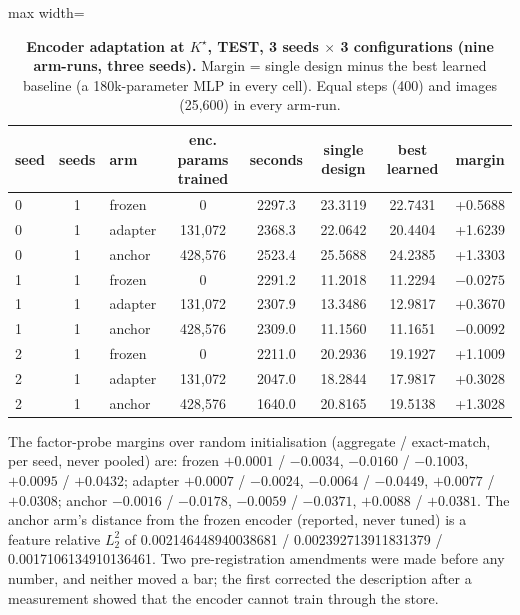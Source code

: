 \documentclass{article} %
\newcommand{\Kstar}{\ensuremath{K^{\star}}}
\begin{document}
\begin{table}[h]
\centering\small
\caption{\textbf{Encoder adaptation at $\Kstar$, TEST, 3 seeds $\times$ 3 configurations (nine
arm-runs, three seeds).} Margin = single design minus the best learned baseline (a 180k-parameter %
MLP in every cell). Equal steps (400) and images (25,600) in every arm-run.} %
\label{tab:adapt}
\setlength{\tabcolsep}{3pt}
\begin{adjustbox}{max width=\linewidth}\begin{tabular}{lclccccc}
\toprule
seed & seeds & arm & enc. params trained & seconds & single design & best learned & margin \\
\midrule
0 & 1 & frozen & 0 & 2297.3 & 23.3119 & 22.7431 & +0.5688 \\
0 & 1 & adapter & 131,072 & 2368.3 & 22.0642 & 20.4404 & +1.6239 \\
0 & 1 & anchor & 428,576 & 2523.4 & 25.5688 & 24.2385 & +1.3303 \\
1 & 1 & frozen & 0 & 2291.2 & 11.2018 & 11.2294 & $-0.0275$ \\
1 & 1 & adapter & 131,072 & 2307.9 & 13.3486 & 12.9817 & +0.3670 \\
1 & 1 & anchor & 428,576 & 2309.0 & 11.1560 & 11.1651 & $-0.0092$ \\
2 & 1 & frozen & 0 & 2211.0 & 20.2936 & 19.1927 & +1.1009 \\
2 & 1 & adapter & 131,072 & 2047.0 & 18.2844 & 17.9817 & +0.3028 \\
2 & 1 & anchor & 428,576 & 1640.0 & 20.8165 & 19.5138 & +1.3028 \\
\bottomrule
\end{tabular}\end{adjustbox}
\end{table}

\noindent The factor-probe margins over random initialisation (aggregate / exact-match, per seed,
never pooled) are: frozen $+0.0001$ / $-0.0034$, $-0.0160$ / $-0.1003$, $+0.0095$ / $+0.0432$; adapter
$+0.0007$ / $-0.0024$, $-0.0064$ / $-0.0449$, $+0.0077$ / $+0.0308$; anchor $-0.0016$ / $-0.0178$,
$-0.0059$ / $-0.0371$, $+0.0088$ / $+0.0381$. The anchor arm's distance from the frozen encoder
(reported, never tuned) is a feature relative $L_2^2$ of 0.002146448940038681 / 0.002392713911831379 /
0.0017106134910136461. %
Two pre-registration amendments were made before any number, and neither moved a bar; the first
corrected the description after a measurement showed that the encoder cannot train through the
store. %
\end{document}
